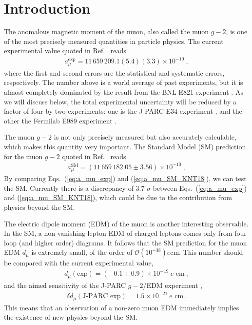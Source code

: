 \section{Introduction}

The anomalous magnetic moment of the muon, also called
the muon $g-2$, is one of the most precisely measured
quantities in particle physics.  The current experimental
value quoted in Ref.~\cite{PDG} reads
%
\begin{align}
 a_{\mu}^{\text{exp}}
= 11 \, 659 \, 209.1 (5.4) (3.3) \times 10^{-10} ~,
\label{eq:a_mu_exp}
\end{align}
%
where the first and second errors are the statistical and
systematic errors, respectively.  The number above is a
world average of past experiments, but it is almost completely
dominated by the result from the BNL E821
experiment \cite{Bennett:2006fi}.  
As we will discuss below, the total experimental uncertainty
will be reduced by a factor of four by two experiments: one is 
the J-PARC E34 experiment \cite{TDRsummarypaper}, 
and the other the Fermilab E989 experiment \cite{Grange:2015fou}.

The muon $g-2$ is not only precisely measured but also accurately
calculable, which makes this quantity very important.
The Standard Model (SM) prediction for the muon $g-2$ quoted in
Ref.~\cite{KNT18} reads
%
\begin{align}
 a_{\mu}^{\text{SM}}
= (11 \, 659 \, 182.05 \pm 3.56) \times 10^{-10} ~,
\label{eq:a_mu_SM_KNT18}
\end{align}
%
By comparing Eqs.~(\ref{eq:a_mu_exp}) and (\ref{eq:a_mu_SM_KNT18}),
we can test the SM.  Currently there is a discrepancy of 
3.7 $\sigma$ between Eqs.~(\ref{eq:a_mu_exp}) and (\ref{eq:a_mu_SM_KNT18}), 
which could be due to the contribution from physics beyond the SM. 

The electric dipole moment (EDM) of the muon is another interesting
observable.  In the SM, a non-vanishing lepton EDM of charged leptons
comes only from four loop (and higher order) diagrams.  It follows
that the SM prediction for the muon EDM $d_\mu$ is extremely small,
of the order of ${\mathcal O}(10^{-38}) e \text{cm}$.
This number should be compared with the current experimental
value,
%
\begin{align}
 d_\mu(\text{exp}) = (-0.1 \pm 0.9) \times 10^{-19} \ e \text{ cm} ~,
\end{align}
%
and the aimed sensitivity of the J-PARC $g-2$/EDM
experiment \cite{TDRsummarypaper},
%
\begin{align}
 \delta d_\mu(\text{J-PARC exp}) = 1.5 \times 10^{-21} \ e \text{ cm} ~.
\end{align}
%
This means that an observation of a non-zero muon EDM immediately
implies the existence of new physics beyond the SM.  

